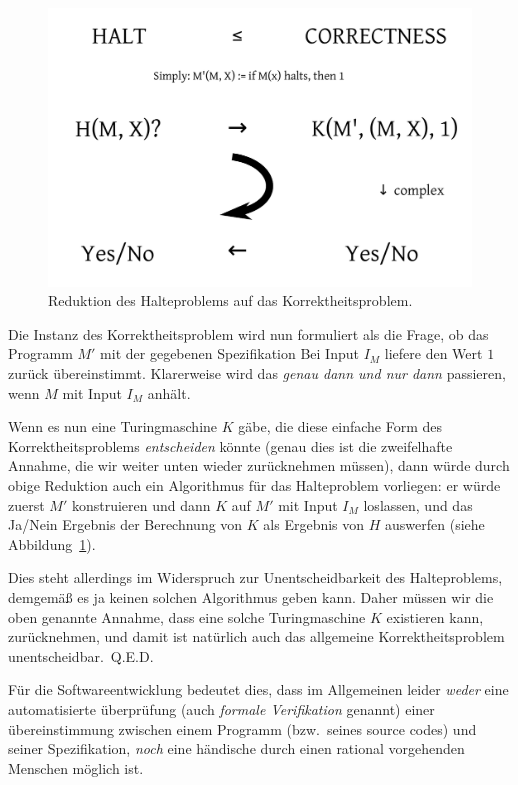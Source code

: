 \begin{figure}[h]
\centering
\includegraphics[width=12cm]{img/correctnessproblem}
\caption{Reduktion des Halteproblems auf das Korrektheitsproblem.}
\label{fig:correctnessproblem}
\end{figure}

Die Instanz des Korrektheitsproblem wird nun formuliert als die Frage, ob das Programm $M'$ mit der gegebenen Spezifikation \glqq{}Bei Input $I_M$ liefere den Wert $1$ zurück\grqq{} übereinstimmt. Klarerweise wird das \emph{genau dann und nur dann} passieren, wenn $M$ mit Input $I_M$ anhält.

Wenn es nun eine Turingmaschine $K$ gäbe, die diese einfache Form des Korrektheitspro\-blems \emph{entscheiden} könnte (genau dies ist die zweifelhafte Annahme, die wir weiter unten wieder zurücknehmen müssen), dann würde durch obige Reduktion auch ein Algorithmus für das Halteproblem vorliegen: er würde zuerst $M'$ konstruieren und dann $K$ auf $M'$ mit Input $I_M$ loslassen, und das Ja/Nein Ergebnis der Berechnung von $K$ als Ergebnis von $H$ auswerfen (siehe Abbildung~\ref{fig:correctnessproblem}).

Dies steht allerdings im Widerspruch zur Unentscheidbarkeit des Halteproblems, demge\-mäß es ja keinen solchen Algorithmus geben kann. Daher müssen wir die oben genannte Annahme, dass eine solche Turingmaschine $K$ existieren kann, zurücknehmen, und damit ist natürlich auch das allgemeine Korrektheitsproblem unentscheidbar.~Q.E.D.\newline

Für die Softwareentwicklung bedeutet dies, dass im Allgemeinen leider \emph{weder} eine automatisierte überprüfung (auch \emph{formale Verifikation} genannt) einer übereinstimmung zwischen einem Programm (bzw.\ seines source codes) und seiner Spezifikation, \emph{noch} eine händische durch einen rational vorgehenden Menschen möglich ist.
